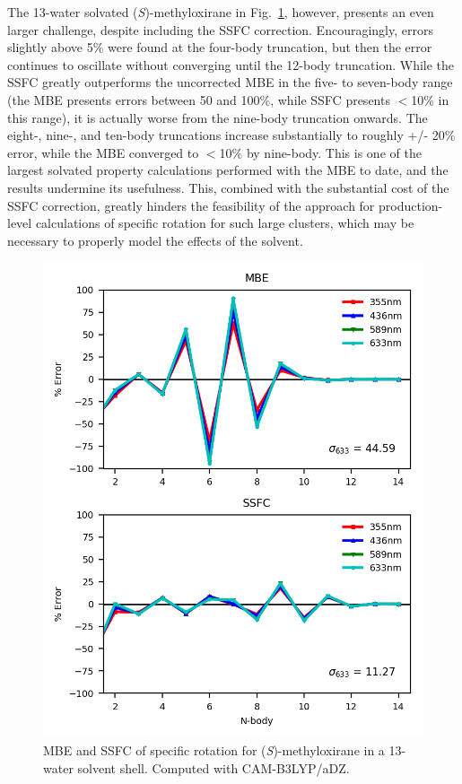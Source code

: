         The 13-water solvated (\textit{S})-methyloxirane in Fig.~\ref{metox_13_rot}, however, presents an even larger challenge, despite including the SSFC correction. Encouragingly, errors slightly above 5\% were found at the four-body truncation, but then the error continues to oscillate without converging until the 12-body truncation. While the SSFC greatly outperforms the uncorrected MBE in the five- to seven-body range (the MBE presents errors between 50 and 100\%, while SSFC presents $<$10\% in this range), it is actually worse from the nine-body truncation onwards. The eight-, nine-, and ten-body truncations increase substantially to roughly +/- 20\% error, while the MBE converged to $<$10\% by nine-body. This is one of the largest solvated property calculations performed with the MBE to date, and the results undermine its usefulness. This, combined with the substantial cost of the SSFC correction, greatly hinders the feasibility of the approach for production-level calculations of specific rotation for such large clusters, which may be necessary to properly model the effects of the solvent. 

        \begin{figure}
            \centering
            \includegraphics[scale=0.75]{p1/graphs/metox_13_rot.png}
            \caption{MBE and SSFC of specific rotation for (\textit{S})-methyloxirane in a 13-water solvent shell. Computed with CAM-B3LYP/aDZ.}
            \label{metox_13_rot}
        \end{figure}

